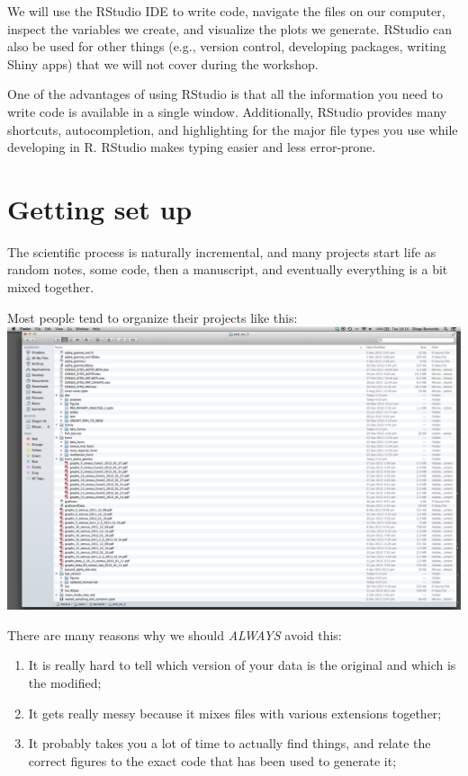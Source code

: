 \documentclass[]{book}
\providecommand{\tightlist}{%
  \setlength{\itemsep}{0pt}\setlength{\parskip}{0pt}}
\begin{document}
We will use the RStudio IDE to write code, navigate the files on our
computer, inspect the variables we create, and visualize the plots we
generate. RStudio can also be used for other things (e.g., version
control, developing packages, writing Shiny apps) that we will not cover
during the workshop.

One of the advantages of using RStudio is that all the information you
need to write code is available in a single window. Additionally,
RStudio provides many shortcuts, autocompletion, and highlighting for
the major file types you use while developing in R. RStudio makes typing
easier and less error-prone.

\section{Getting set up}\label{getting-set-up}

The scientific process is naturally incremental, and many projects start
life as random notes, some code, then a manuscript, and eventually
everything is a bit mixed together.

Most people tend to organize their projects like this:
\includegraphics{./fig/bad_layout.png}

There are many reasons why we should \emph{ALWAYS} avoid this:

\begin{enumerate}
\def\labelenumi{\arabic{enumi}.}
\tightlist
\item
  It is really hard to tell which version of your data is the original
  and which is the modified;
\item
  It gets really messy because it mixes files with various extensions
  together;
\item
  It probably takes you a lot of time to actually find things, and
  relate the correct figures to the exact code that has been used to
  generate it;
\end{enumerate}
\end{document}
